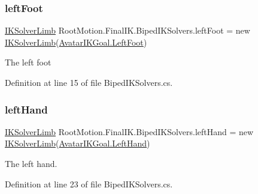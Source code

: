 \subsubsection{\texorpdfstring{left\+Foot}{leftFoot}}
{\footnotesize\ttfamily \mbox{\hyperlink{class_root_motion_1_1_final_i_k_1_1_i_k_solver_limb}{I\+K\+Solver\+Limb}} Root\+Motion.\+Final\+I\+K.\+Biped\+I\+K\+Solvers.\+left\+Foot = new \mbox{\hyperlink{class_root_motion_1_1_final_i_k_1_1_i_k_solver_limb}{I\+K\+Solver\+Limb}}(\mbox{\hyperlink{namespace_root_motion_1_1_final_i_k_ae0dd2058c7667b6f132c11a6b860c14aae81960506fa9c17a1fa39c529ae1bf50}{Avatar\+I\+K\+Goal.\+Left\+Foot}})}



The left foot 



Definition at line 15 of file Biped\+I\+K\+Solvers.\+cs.

\mbox{\label{class_root_motion_1_1_final_i_k_1_1_biped_i_k_solvers_a3aac72ddabdd676c6b6f281fc4b38a60}} 
\subsubsection{\texorpdfstring{left\+Hand}{leftHand}}
{\footnotesize\ttfamily \mbox{\hyperlink{class_root_motion_1_1_final_i_k_1_1_i_k_solver_limb}{I\+K\+Solver\+Limb}} Root\+Motion.\+Final\+I\+K.\+Biped\+I\+K\+Solvers.\+left\+Hand = new \mbox{\hyperlink{class_root_motion_1_1_final_i_k_1_1_i_k_solver_limb}{I\+K\+Solver\+Limb}}(\mbox{\hyperlink{namespace_root_motion_1_1_final_i_k_ae0dd2058c7667b6f132c11a6b860c14aa03f7bbbc02c9006ea393ec4ef5843d7b}{Avatar\+I\+K\+Goal.\+Left\+Hand}})}



The left hand. 



Definition at line 23 of file Biped\+I\+K\+Solvers.\+cs.

\mbox{\label{class_root_motion_1_1_final_i_k_1_1_biped_i_k_solvers_a79e88262392136532d3f55bef8c2fdc2}} 
